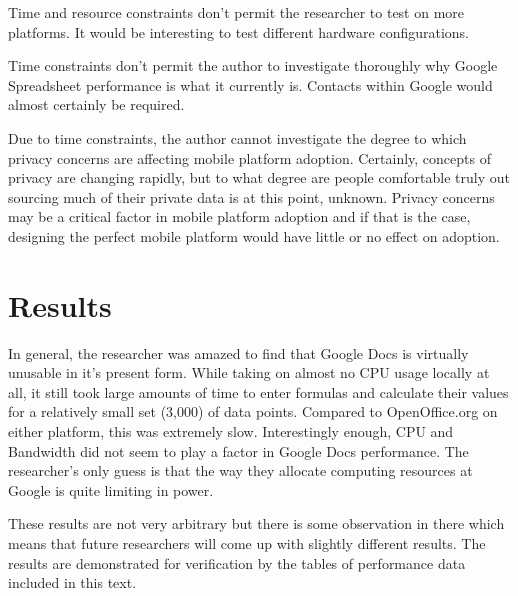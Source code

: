 \documentclass[12pt,oneside,letterpaper,titlepage]{article}
\begin{document}
Time and resource constraints don't permit the researcher to test on more
platforms.  It would be interesting to test different hardware configurations.

Time constraints don't permit the author to investigate thoroughly why Google
Spreadsheet performance is what it currently is.  Contacts within Google would
almost certainly be required.

Due to time constraints, the author cannot investigate the degree to which
privacy concerns are affecting mobile platform adoption.  Certainly, concepts of
privacy are changing rapidly, but to what degree are people comfortable truly
out sourcing much of their private data is at this point, unknown.  Privacy
concerns may be a critical factor in mobile platform adoption and if that is the
case, designing the perfect mobile platform would have little or no effect on
adoption.

\section{Results}

In general, the researcher was amazed to find that Google Docs is virtually
unusable in it's present form.  While taking on almost no CPU usage locally at
all, it still took large amounts of time to enter formulas and calculate their
values for a relatively small set (3,000) of data points.  Compared to
OpenOffice.org on either platform, this was extremely slow.  Interestingly
enough, CPU and Bandwidth did not seem to play a factor in Google Docs
performance.  The researcher's only guess is that the way they allocate
computing resources at Google is quite limiting in power.

These results are not very arbitrary but there is some observation in there
which means that future researchers will come up with slightly different
results.  The results are demonstrated for verification by the tables of
performance data included in this text.
\end{document}

